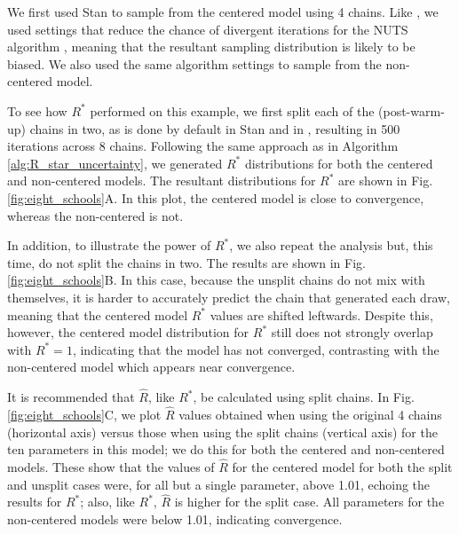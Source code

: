 \documentclass{article}
\begin{document}
We first used Stan \citep{carpenter2017stan} to sample from the centered model using 4 chains. Like \cite{vehtari2019rank}, we used settings that reduce the chance of divergent iterations for the NUTS algorithm \citep{betancourt2017conceptual}, meaning that the resultant sampling distribution is likely to be biased. We also used the same algorithm settings to sample from the non-centered model.

To see how $R^*$ performed on this example, we first split each of the (post-warm-up) chains in two, as is done by default in Stan \citep{carpenter2017stan} and in \cite{vehtari2019rank}, resulting in 500 iterations across 8 chains. Following the same approach as in Algorithm \ref{alg:R_star_uncertainty}, we generated $R^*$ distributions for both the centered and non-centered models. The resultant distributions for $R^*$ are shown in Fig.\ref{fig:eight_schools}A. In this plot, the centered model is close to convergence, whereas the non-centered is not.

In addition, to illustrate the power of $R^*$, we also repeat the analysis but, this time, do not split the chains in two. The results are shown in Fig.\ref{fig:eight_schools}B. In this case, because the unsplit chains do not mix with themselves, it is harder to accurately predict the chain that generated each draw, meaning that the centered model $R^*$ values are shifted leftwards. Despite this, however, the centered model distribution for $R^*$ still does not strongly overlap with $R^*=1$, indicating that the model has not converged, contrasting with the non-centered model which appears near convergence.

It is recommended that $\widehat{R}$, like $R^*$, be calculated using split chains. In Fig. \ref{fig:eight_schools}C, we plot $\widehat{R}$ values obtained when using the original 4 chains (horizontal axis) versus those when using the split chains (vertical axis) for the ten parameters in this model; we do this for both the centered and non-centered models. These show that the values of $\widehat{R}$ for the centered model for both the split and unsplit cases were, for all but a single parameter, above 1.01, echoing the results for $R^*$; also, like $R^*$, $\widehat{R}$ is higher for the split case. All parameters for the non-centered models were below 1.01, indicating convergence.
\end{document}
